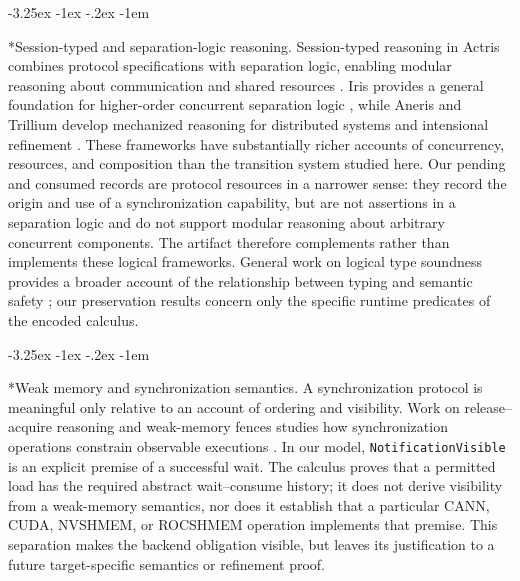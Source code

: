 \documentclass[a4paper,USenglish]{lipics-v2021}
\makeatletter
\renewcommand\paragraph{\@startsection{paragraph}{4}{\z@}%
  {-3.25ex \@plus -1ex \@minus -.2ex}%
  {-1em}%
  {\sffamily\large\bfseries\raggedright}}
\makeatother
\begin{document}
\paragraph*{Session-typed and separation-logic reasoning.} Session-typed reasoning in Actris combines protocol specifications with
separation logic, enabling modular reasoning about communication and shared
resources \cite{hinrichsen2020actris}. Iris provides a general foundation
for higher-order concurrent separation logic \cite{jung2018iris}, while
Aneris and Trillium develop mechanized reasoning for distributed systems and
intensional refinement \cite{krogh2020aneris,timany2024trillium}.
These frameworks have substantially richer accounts of concurrency,
resources, and composition than the transition system studied here. Our
pending and consumed records are protocol resources in a narrower sense:
they record the origin and use of a synchronization capability, but are not
assertions in a separation logic and do not support modular reasoning about
arbitrary concurrent components. The artifact therefore complements rather
than implements these logical frameworks. General work on logical type
soundness provides a broader account of the relationship between typing and
semantic safety \cite{timany2024logical}; our preservation results concern
only the specific runtime predicates of the encoded calculus.

\paragraph*{Weak memory and synchronization semantics.} A synchronization protocol is meaningful only relative to an account of
ordering and visibility. Work on release--acquire reasoning and weak-memory
fences studies how synchronization operations constrain observable
executions \cite{kaiser2017strong,alglave2010fences}. In our model,
\texttt{NotificationVisible} is an explicit premise of a successful wait.
The calculus proves that a permitted load has the required abstract
wait--consume history; it does not derive visibility from a weak-memory
semantics, nor does it establish that a particular CANN, CUDA, NVSHMEM, or
ROCSHMEM operation implements that premise. This separation makes the
backend obligation visible, but leaves its justification to a future
target-specific semantics or refinement proof.
\end{document}
